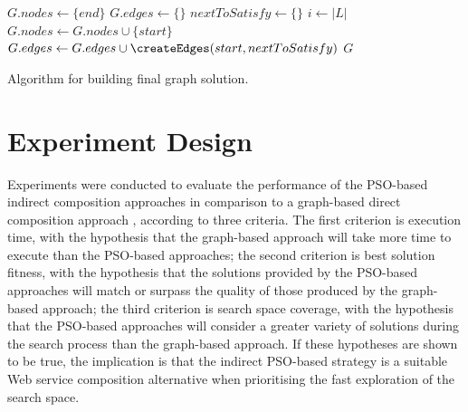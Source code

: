 \documentclass{llncs}
\begin{document}
\begin{algorithm}
\setlength{}
 \LinesNumbered
 \SetNlSty{}{}{:}
 $G.nodes \leftarrow \{end\}$\;
 $G.edges \leftarrow \{\}$\;
 $nextToSatisfy \leftarrow \{\}$\;
 $i \leftarrow |L|$\;
 $G.nodes \leftarrow G.nodes \cup \{start\}$\;
 $G.edges \leftarrow G.edges \cup \createEdges(start,nextToSatisfy)$\;
 \Return $G$\;
\caption{Algorithm for building final graph solution.}
\label{solutionBuilding}
\end{algorithm}

\section{Experiment Design}\label{experiment_design}

Experiments were conducted to evaluate the performance of the PSO-based indirect composition approaches in comparison to a graph-based direct composition approach \cite{da2015graphevol}, according to three criteria. The first criterion is execution time, with the hypothesis that the graph-based approach will take more time to execute than the PSO-based approaches; the second criterion is best solution fitness, with the hypothesis that the solutions provided by the PSO-based approaches will match or surpass the quality of those produced by the graph-based approach; the third criterion is search space coverage, with the hypothesis that the PSO-based approaches will consider a greater variety of solutions during the search process than the graph-based approach. If these hypotheses are shown to be true, the implication is that the indirect PSO-based strategy is a suitable Web service composition alternative when prioritising the fast exploration of the search space.
\end{document}
